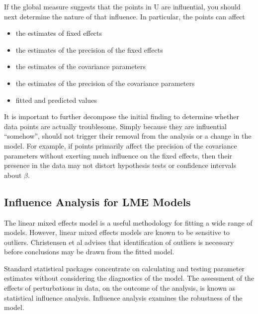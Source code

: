 \documentclass[00-MASTER.tex]{subfiles}
\begin{document}
	
	If the global measure suggests that the points in U are influential, you should next determine the nature of
	that influence. In particular, the points can affect
	\begin{itemize}
		\item the estimates of fixed effects
		\item the estimates of the precision of the fixed effects
		\item the estimates of the covariance parameters
		\item the estimates of the precision of the covariance parameters
		\item fitted and predicted values
	\end{itemize}
	
	It is important to further decompose the initial finding to determine whether data points are actually troublesome.
	Simply because they are influential “somehow”, should not trigger their removal from the analysis or
	a change in the model. For example, if points primarily affect the precision of the covariance parameters
	without exerting much influence on the fixed effects, then their presence in the data may not distort hypothesis
	tests or confidence intervals about $\beta$.
	
	
	
	\subsection*{Influence Analysis for LME Models} %
	The linear mixed effects model is a useful methodology for fitting a wide range of models. However, linear mixed effects models are known to be sensitive to outliers. Christensen et al advises that identification of outliers is necessary before conclusions may be drawn from the fitted model.
	
	Standard statistical packages concentrate on calculating and testing parameter estimates without considering the diagnostics of the model. The assessment of the effects of perturbations in data, on the outcome of the analysis, is known as statistical influence analysis. Influence analysis examines the robustness of the model. 
	
\end{document}
